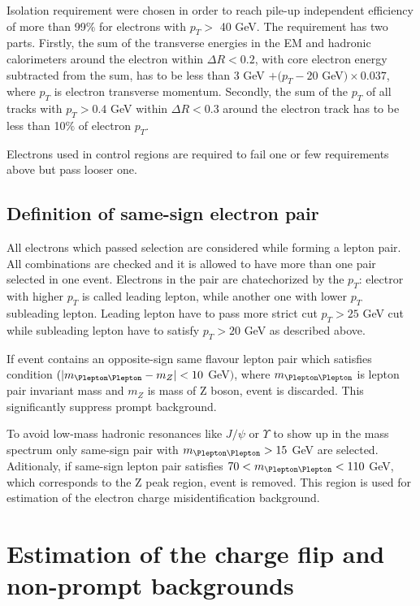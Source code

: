 Isolation requirement were chosen in order to reach pile-up independent efficiency of more than 99$\%$ for electrons 
with $p_T >$ 40 GeV. The requirement has two parts.
Firstly, the sum of the transverse energies in the EM and hadronic calorimeters around the electron within 
$\Delta R < 0.2$, with core electron energy subtracted from the sum, has to be less than 
3 GeV $+ (p_T - 20$ GeV$) \times 0.037$, where $p_T$ is electron transverse momentum.
Secondly, the sum of the $p_T$ of all tracks with $p_T > 0.4$ GeV within $\Delta R < 0.3$ around the electron track has
to be less than 10$\%$ of electron $p_T$.

Electrons used in control regions are required to fail one or few requirements above but pass looser one.

\subsection{Definition of same-sign electron pair}
All electrons which passed selection are considered while forming a lepton pair.
All combinations are checked and it is allowed to have more than one pair selected in one event.
Electrons in the pair are chatechorized by the $p_T$: electror with higher $p_T$ is called leading lepton, while another one with lower $p_T$ subleading lepton.
Leading lepton have to pass more strict cut $p_T>25$ GeV cut while subleading lepton have to satisfy $p_T>20$ GeV as described above.

If event contains an opposite-sign same flavour lepton pair which satisfies condition $( |m_{\Plepton\Plepton} - m_{Z}| < 10$ GeV$)$,
where $m_{\Plepton\Plepton}$ is lepton pair invariant mass and $m_{Z}$ is mass of Z boson, event is discarded.
This significantly suppress prompt background.

To avoid low-mass hadronic resonances like $J/\psi$ or $\varUpsilon$ to show up in the mass spectrum only same-sign pair with $m_{\Plepton\Plepton}>15$ GeV are selected.
Aditionaly, if same-sign lepton pair satisfies $70 < m_{\Plepton\Plepton}< 110$ GeV, which corresponds to the Z peak region, event is removed.
This region is used for estimation of the electron charge misidentification background.

\section{Estimation of the charge flip and non-prompt backgrounds}

